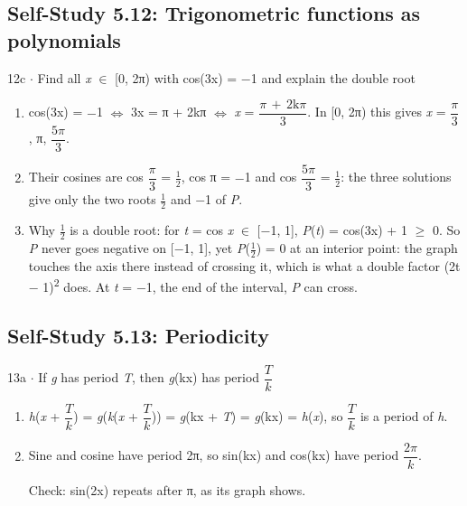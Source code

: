 \documentclass[11pt]{article}
\begin{document}
\begin{keepsection}\subsection{Self-Study 5.12: Trigonometric functions as polynomials}

\begin{workedbox}{12c \ensuremath{\cdot} Find all \textit{x} \ensuremath{\in} [0, 2π) with cos(3x) = \ensuremath{-}1 and explain the double root}
\begin{enumerate}
\item cos(3x) = \ensuremath{-}1 \ensuremath{\Leftrightarrow} 3x = π + 2kπ \ensuremath{\Leftrightarrow} \textit{x} = {\small\ensuremath{\dfrac{π\, +\, 2\mathrm{k}π}{3}}}. In [0, 2π) this gives \textit{x} = {\small\ensuremath{\dfrac{π}{3}}}, π, {\small\ensuremath{\dfrac{5π}{3}}}.
\item Their cosines are cos {\small\ensuremath{\dfrac{π}{3}}} = \ensuremath{\tfrac12}, cos π = \ensuremath{-}1 and cos {\small\ensuremath{\dfrac{5π}{3}}} = \ensuremath{\tfrac12}: the three solutions give only the two roots \ensuremath{\tfrac12} and \ensuremath{-}1 of \textit{P}.
\item Why \ensuremath{\tfrac12} is a double root: for \textit{t} = cos \textit{x} \ensuremath{\in} [\ensuremath{-}1, 1], \textit{P}(\textit{t}) = cos(3x) + 1 \ensuremath{\geq} 0. So \textit{P} never goes negative on [\ensuremath{-}1, 1], yet \textit{P}(\ensuremath{\tfrac12}) = 0 at an interior point: the graph touches the axis there instead of crossing it, which is what a double factor (2t \ensuremath{-} 1)\textsuperscript{2} does. At \textit{t} = \ensuremath{-}1, the end of the interval, \textit{P} can cross.
\end{enumerate}
\end{workedbox}

\end{keepsection}
\begin{keepsection}\subsection{Self-Study 5.13: Periodicity}

\begin{workedbox}{13a \ensuremath{\cdot} If \textit{g} has period \textit{T}, then \textit{g}(kx) has period {\small\ensuremath{\dfrac{{T}}{{k}}}}}
\begin{enumerate}
\item \textit{h}(\textit{x} + {\small\ensuremath{\dfrac{{T}}{{k}}}}) = \textit{g}(\textit{k}(\textit{x} + {\small\ensuremath{\dfrac{{T}}{{k}}}})) = \textit{g}(kx + \textit{T}) = \textit{g}(kx) = \textit{h}(\textit{x}), so {\small\ensuremath{\dfrac{{T}}{{k}}}} is a period of \textit{h}.
\item {}
Sine and cosine have period 2π, so sin(kx) and cos(kx) have period {\small\ensuremath{\dfrac{2π}{{k}}}}.

Check: sin(2x) repeats after π, as its graph shows.
\end{enumerate}
\end{workedbox}

\end{keepsection}
\end{document}
